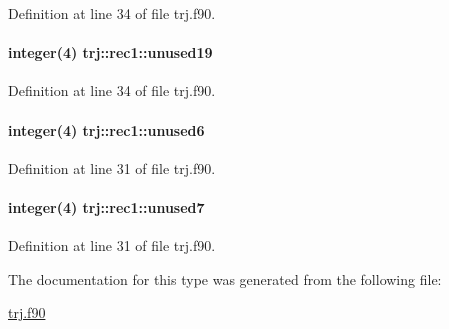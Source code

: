 Definition at line 34 of file trj.\-f90.

\hypertarget{structtrj_1_1rec1_abb239d4dc4924a374ca7edaa85105aa9}{
\paragraph[{unused19}]{\setlength{\rightskip}{0pt plus 5cm}integer(4) trj\-::rec1\-::unused19\hspace{0.3cm}{\ttfamily [private]}}}\label{structtrj_1_1rec1_abb239d4dc4924a374ca7edaa85105aa9}


Definition at line 34 of file trj.\-f90.

\hypertarget{structtrj_1_1rec1_af5ba3e012645bd707d9398686802ac7b}{
\paragraph[{unused6}]{\setlength{\rightskip}{0pt plus 5cm}integer(4) trj\-::rec1\-::unused6\hspace{0.3cm}{\ttfamily [private]}}}\label{structtrj_1_1rec1_af5ba3e012645bd707d9398686802ac7b}


Definition at line 31 of file trj.\-f90.

\hypertarget{structtrj_1_1rec1_adad6f84db42ddc156c148af1592bf3cf}{
\paragraph[{unused7}]{\setlength{\rightskip}{0pt plus 5cm}integer(4) trj\-::rec1\-::unused7\hspace{0.3cm}{\ttfamily [private]}}}\label{structtrj_1_1rec1_adad6f84db42ddc156c148af1592bf3cf}


Definition at line 31 of file trj.\-f90.



The documentation for this type was generated from the following file\-:\begin{DoxyCompactItemize}
\item 
\hyperlink{trj_8f90}{trj.\-f90}\end{DoxyCompactItemize}
